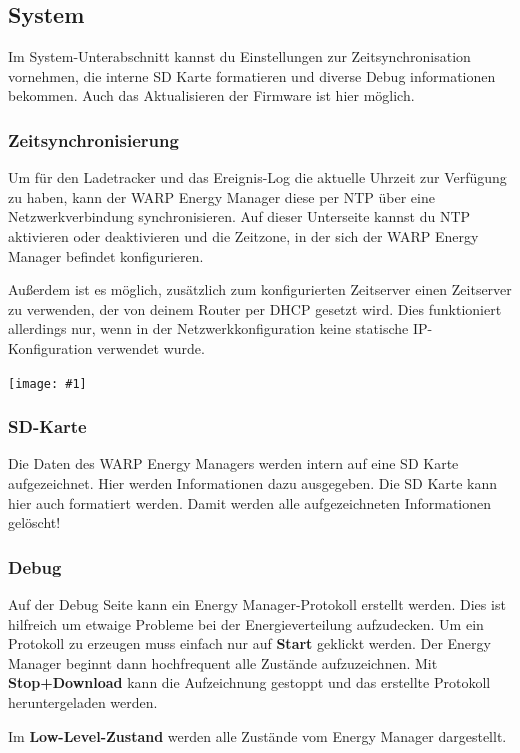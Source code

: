 \documentclass[a4paper,10pt]{article}
\newcommand{\gfx}[1]{\texttt{[image: \#1]}}
\begin{document}
\begin{multicols*}{2}
	\subsection{System}
	Im System-Unterabschnitt kannst du Einstellungen zur Zeitsynchronisation
	vornehmen, die interne SD Karte formatieren und diverse Debug informationen
	bekommen. Auch das Aktualisieren der Firmware ist hier möglich.

	\subsubsection{Zeitsynchronisierung}\label{ntp}
	Um für den Ladetracker und das Ereignis-Log die aktuelle Uhrzeit zur
	Verfügung zu haben, kann der WARP Energy Manager diese per NTP über
	eine Netzwerkverbindung synchronisieren. Auf dieser Unterseite kannst du NTP aktivieren oder deaktivieren und die Zeitzone, in der sich
	der WARP Energy Manager befindet konfigurieren.

	Außerdem ist es möglich, zusätzlich zum konfigurierten Zeitserver einen Zeitserver zu verwenden, der von deinem Router per DHCP gesetzt wird. Dies funktioniert allerdings nur,
	wenn in der Netzwerkkonfiguration keine statische IP-Konfiguration verwendet wurde.

	\gfx{./img/resized/web_ntp}

	\subsubsection{SD-Karte}
	Die Daten des WARP Energy Managers werden intern auf eine SD Karte
	aufgezeichnet. Hier werden Informationen dazu ausgegeben. Die SD Karte kann
	hier auch formatiert werden. Damit werden alle aufgezeichneten Informationen
	gelöscht!

	\subsubsection{Debug}
	Auf der Debug Seite kann ein Energy Manager-Protokoll erstellt werden. Dies
	ist hilfreich um etwaige Probleme bei der Energieverteilung aufzudecken. Um
	ein Protokoll zu erzeugen muss einfach nur auf \textbf{Start} geklickt
	werden. Der Energy Manager beginnt dann hochfrequent alle Zustände
	aufzuzeichnen. Mit \textbf{Stop+Download} kann die Aufzeichnung gestoppt und
	das erstellte Protokoll heruntergeladen werden.

	Im \textbf{Low-Level-Zustand} werden alle Zustände vom Energy Manager
	dargestellt.


\end{multicols*}
\end{document}
